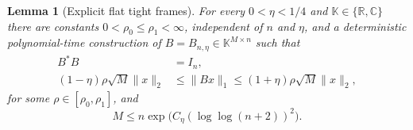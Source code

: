 \documentclass[11pt]{article}
\newtheorem{lemma}[theorem]{Lemma}
\newcommand{\K}{\mathbb K}
\newcommand{\R}{\mathbb R}
\newcommand{\C}{\mathbb C}
\begin{document}
\begin{lemma}[Explicit flat tight frames]\label{lem:flat}
For every $0<\eta<1/4$ and $\K\in\{\R,\C\}$ there are constants
$0<\rho_0\leq\rho_1<\infty$, independent of $n$ and $\eta$, and a
deterministic polynomial-time construction of $B=B_{n,\eta}\in\K^{M\times n}$
such that
\begin{align}
 B^*B&=I_n,\label{eq:tight}\\
 (1-\eta)\rho\sqrt M\|x\|_2
 &\leq \|Bx\|_1
 \leq(1+\eta)\rho\sqrt M\|x\|_2,\label{eq:nearly-flat}
\end{align}
for some $\rho\in[\rho_0,\rho_1]$, and
\begin{equation}\label{eq:flat-dim}
 M\leq n\exp\!\bigl(C_\eta(\log\log(n+2))^2\bigr).
\end{equation}
\end{lemma}
\end{document}
